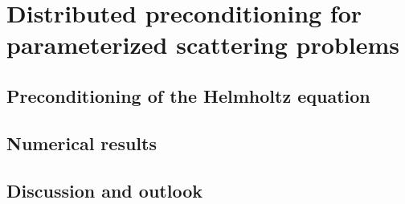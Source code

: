 \chapter[Distributed preconditioning of scattering problems]{Distributed preconditioning for parameterized scattering problems}
\label{ch:distributed-preconditioning-for-the-parameterized-scatterer}


\section{Preconditioning of the Helmholtz equation}\label{sec:application-to-the-helmholtz-equation}


\section{Numerical results}\label{sec:numerical-results-precond}


\section{Discussion and outlook}\label{sec:discussion-and-extensions}


\clearpage\null\newpage\null\thispagestyle{empty}